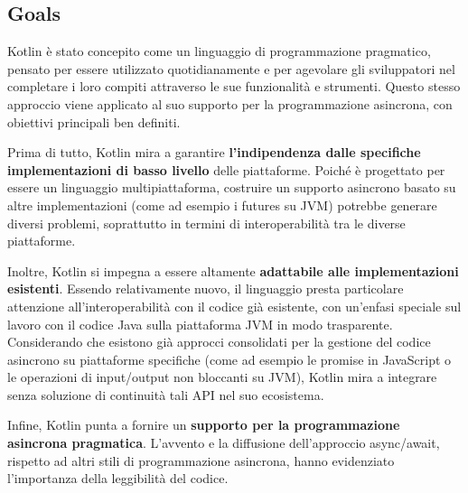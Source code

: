 \documentclass[12pt,a4paper,openright,twoside]{book}
\begin{document}
\subsection{Goals}
Kotlin è stato concepito come un linguaggio di programmazione pragmatico, pensato per essere utilizzato quotidianamente e per agevolare gli sviluppatori nel completare i loro compiti attraverso le sue funzionalità e strumenti. Questo stesso approccio viene applicato al suo supporto per la programmazione asincrona, con obiettivi principali ben definiti.

Prima di tutto, Kotlin mira a garantire \textbf{l'indipendenza dalle specifiche implementazioni di basso livello} delle piattaforme. Poiché è progettato per essere un linguaggio multipiattaforma, costruire un supporto asincrono basato su altre implementazioni (come ad esempio i futures su JVM) potrebbe generare diversi problemi, soprattutto in termini di interoperabilità tra le diverse piattaforme.

Inoltre, Kotlin si impegna a essere altamente \textbf{adattabile alle implementazioni esistenti}. Essendo relativamente nuovo, il linguaggio presta particolare attenzione all'interoperabilità con il codice già esistente, con un'enfasi speciale sul lavoro con il codice Java sulla piattaforma JVM in modo trasparente. Considerando che esistono già approcci consolidati per la gestione del codice asincrono su piattaforme specifiche (come ad esempio le promise in JavaScript o le operazioni di input/output non bloccanti su JVM), Kotlin mira a integrare senza soluzione di continuità tali API nel suo ecosistema.

Infine, Kotlin punta a fornire un \textbf{supporto per la programmazione asincrona pragmatica}. L'avvento e la diffusione dell'approccio async/await, rispetto ad altri stili di programmazione asincrona, hanno evidenziato l'importanza della leggibilità del codice.
\end{document}
